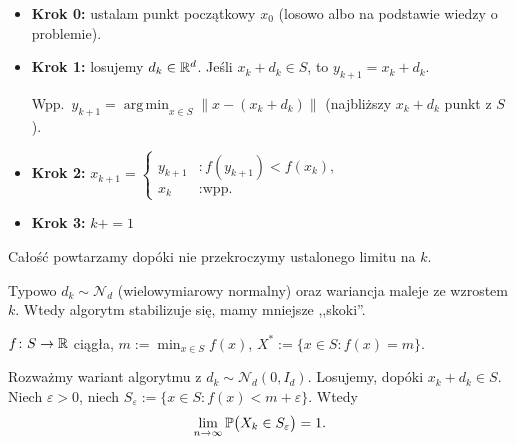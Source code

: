 \documentclass[dvipsnames]{book}
\begin{document}
\hrulefill

\begin{algorytm}
\begin{itemize}[topsep=0pt,itemsep=0pt]
  \item \textbf{Krok 0:} ustalam punkt początkowy $x_0$ (losowo albo na podstawie
  wiedzy o problemie).
  \item \textbf{Krok 1:} losujemy $d_k \in \R^d$. Jeśli $x_k + d_k \in S$, to
  $y_{k+1} = x_k + d_k$.

  Wpp.\ $y_{k+1} = \operatorname*{arg\,min}_{x \in S} \|x - (x_k + d_k)\|$
  (najbliższy $x_k + d_k$ punkt z $S$).
  \item \textbf{Krok 2:} $x_{k+1} = \begin{cases}
    y_{k+1} & : f(y_{k+1}) < f(x_k), \\
    x_k & : \text{wpp.}
  \end{cases}$
  \item \textbf{Krok 3:} $k \mathrel{{+}{=}} 1$
\end{itemize}
Całość powtarzamy dopóki nie przekroczymy ustalonego limitu na $k$.
\end{algorytm}

Typowo $d_k \sim \mathcal{N}_d$ (wielowymiarowy normalny) oraz wariancja maleje ze
wzrostem $k$. Wtedy algorytm stabilizuje się, mamy mniejsze ,,skoki''.

\begin{twierdzenie}
$f \colon S \to \R$ ciągła, $m := \min_{x \in S} f(x)$,
$X^* := \{x \in S : f(x) = m\}$.

Rozważmy wariant algorytmu z $d_k \sim \mathcal{N}_d(0, I_d)$. Losujemy, dopóki
$x_k + d_k \in S$. Niech $\varepsilon > 0$, niech
$S_\varepsilon := \{x \in S : f(x) < m + \varepsilon\}$. Wtedy
\[
  \lim_{n \to \infty} \P\big(X_k \in S_\varepsilon\big) = 1.
\]
\end{twierdzenie}

\hrulefill
\end{document}
